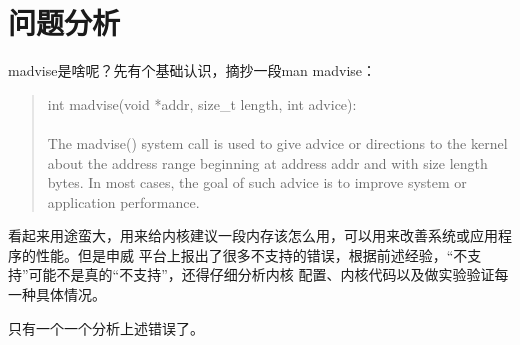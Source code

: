 \documentclass[scheme=plain]{ctexart}
\begin{document}
\section{问题分析}
\label{sec:wtfx}
madvise是啥呢？先有个基础认识，摘抄一段man madvise：
\begin{quote}
  int madvise(void *addr, size\_t length, int advice):\\ \\
  The  madvise()  system call is used to give advice or directions to the kernel about the
  address range beginning at address addr and with size length bytes. In most cases, the
  goal of such advice is to improve system or application performance.
\end{quote}

看起来用途蛮大，用来给内核建议一段内存该怎么用，可以用来改善系统或应用程序的性能。但是申威
平台上报出了很多不支持的错误，根据前述经验，“不支持”可能不是真的“不支持”，还得仔细分析内核
配置、内核代码以及做实验验证每一种具体情况。

只有一个一个分析上述错误了。
\end{document}
